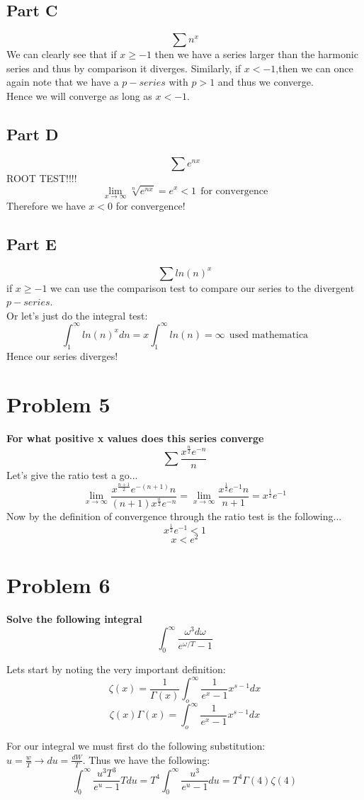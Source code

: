 \documentclass[10pt,a4paper]{article}
\begin{document}
	\subsection{Part C}
	$$ \sum n^x$$
	We  can clearly see that if $x\geq-1$ then we have a series larger than the harmonic series and thus by comparison it diverges. Similarly, if $x<-1$,then we can once again note that we have a $p-series$ with $p>1$ and thus we converge.\\
	Hence we will converge as long as $x<-1$.
	
	\subsection{Part D}
	$$\sum e^{nx} $$
	ROOT TEST!!!!
	$$\lim_{x\to\infty}\sqrt[n]{e^{nx}} = e^x < 1 \ \ \text{for convergence} $$
	Therefore we have $x<0$ for convergence!
	
	\subsection{Part E}
	$$ \sum ln(n)^x $$
	if $x\geq -1$ we can use the comparison test to compare our series to the divergent $p-series$.\\
	Or let's just do the integral test:
	$$\int_1^\infty ln(n)^x dn = x \int_1^\infty ln(n) = \infty \ \ \text{used mathematica}$$
	Hence our series diverges! 

	\newpage
	\section{Problem 5}
	\textbf{For what positive x values does this series converge}\\
	$$\sum \frac{x^\frac{n}{2}e^{-n}}{n} $$
	Let's give the ratio test a go...
	$$\lim_{x\to\infty}\frac{x^\frac{n+1}{2}e^{-(n+1)}n}{(n+1)x^{\frac{n}{2}}e^{-n}} = \lim_{x\to\infty}\frac{x^\frac{1}{2}e^{-1}n}{n+1} = x^\frac{1}{2}e^{-1} $$	
	Now by the definition of convergence through the ratio test is the following...
	$$x^\frac{1}{2}e^{-1}<1 $$
	$$x<e^2$$
	\newpage
	\section{Problem 6}
	\textbf{Solve the following integral}
	$$\int^{\infty}_0 \frac{\omega^3 d \omega}{e^{\omega/T}-1} $$
	
	Lets start by noting the very important definition:
	$$\zeta (x) = \frac{1}{\Gamma(x)}\int_o^\infty \frac{1}{e^x-1}x^{s-1}dx$$
	$$\zeta(x) \Gamma(x) = \int_o^\infty \frac{1}{e^x-1}x^{s-1}dx $$
	
	For our integral we must first do the following substitution:\\
	\indent  $u = \frac{w}{T} \rightarrow du=\frac{dW}{T}$.
	Thus we have the following:
	$$\int_0^\infty \frac{u^3T^3}{e^u-1}Tdu = T^4\int_0^\infty\frac{u^3}{e^u-1}du = T^4\Gamma(4)\zeta(4) $$
\end{document}
